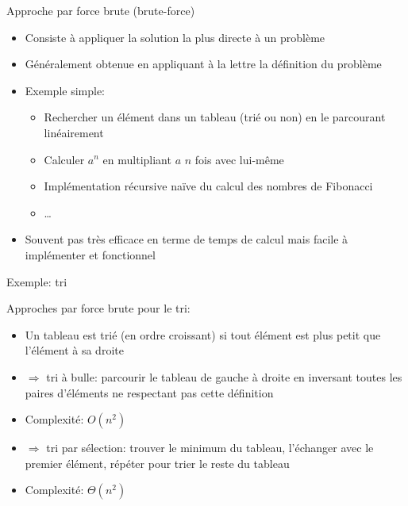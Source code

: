 \begin{frame}{Approche par force brute (brute-force)}
\begin{itemize}
\item Consiste à appliquer la solution la plus directe à un problème
\item Généralement obtenue en appliquant à la lettre la définition du problème
\item Exemple simple:
\begin{itemize}
\item Rechercher un élément dans un tableau (trié ou non) en le parcourant linéairement
\item Calculer $a^n$ en multipliant $a$ $n$ fois avec lui-même
\item Implémentation récursive naïve du calcul des nombres de Fibonacci
\item \ldots
\end{itemize}
\item Souvent pas très efficace en terme de temps de calcul mais facile à implémenter et fonctionnel
\end{itemize}

\end{frame}

\begin{frame}{Exemple: tri}

Approches par force brute pour le tri:
\begin{itemize}
\item Un tableau est trié (en ordre croissant) si tout élément est plus petit que l'élément à sa droite
\item $\Rightarrow$ tri à bulle: parcourir le tableau de gauche à droite en inversant toutes les paires d'éléments ne respectant pas cette définition
\item Complexité: $O(n^2)$
\item $\Rightarrow$ tri par sélection: trouver le minimum du tableau, l'échanger avec le premier élément, répéter pour trier le reste du tableau
\item Complexité: $\Theta(n^2)$
\end{itemize}
\end{frame}

